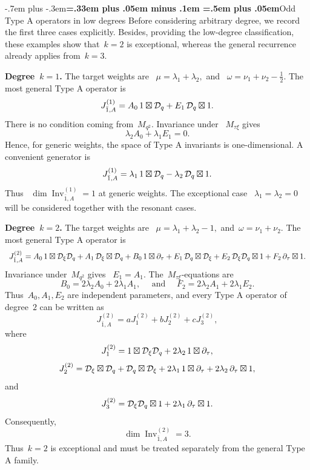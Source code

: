 \documentclass[12pt,a4paper]{amsart}
\makeatletter
\providecommand{\headspaces}{\spaceskip=.33em plus .05em minus .1em \xspaceskip=.5em plus .05em}
\def\subsubsection{\@startsection{subsubsection}{3}{0pt}{-1ex \@plus -.4ex \@minus -.2ex}%
  {-.7em plus -.3em}{\normalfont\normalsize\bfseries\boldmath\headspaces}}
\theoremstyle{thm}
\theoremstyle{definition}
\newcommand {\Dq}{\cD_q}
\newcommand {\Dxi}{\cD_\xi}
\makeatother
\begin{document}
\subsubsection{Odd Type A operators in low degrees}
Before considering arbitrary degree, we record the first three cases
explicitly. Besides, providing the low-degree classification, these
examples show that~\(k=2\) is exceptional, whereas the general
recurrence already applies from~\(k=3\).

{\bf Degree~\(k=1\).} The target weights are~%
$
\mu=\lambda_1+\lambda_2,
$ and~%
$\omega=\nu_1+\nu_2-\frac12.
$ The most general Type A operator is
\[
J_{\bar1,A}^{(1)}
=
A_0\,1\boxtimes \Dq
+
E_1\,\Dq\boxtimes1.
\]
There is no condition coming from~\(M_{q^2}\). Invariance under~%
\(M_{\tau\xi}\) gives
\[
\lambda_2A_0+\lambda_1E_1=0.
\]
Hence, for generic weights, the space of Type A invariants is
one-dimensional. A convenient generator is
\[
J_{\bar1,A}^{(1)}
=
\lambda_1\,1\boxtimes \Dq
-
\lambda_2\,\Dq\boxtimes1.
\]
Thus~%
$
\dim\operatorname{Inv}_{\bar1,A}^{(1)}=1
$ at generic weights. The exceptional case~%
$
\lambda_1=\lambda_2=0
$ will be considered together with the resonant cases.

{\bf Degree~\(k=2\).} The target weights are~%
$
\mu=\lambda_1+\lambda_2-1,
$ and~$
\omega=\nu_1+\nu_2.
$ The most general Type A operator is
\[
\begin{array}{r@{}l}
J_{\bar1,A}^{(2)}
={}&
A_0\,1\boxtimes \Dxi\Dq
+
A_1\,\Dxi\boxtimes \Dq
+
B_0\,1\boxtimes \partial_\tau
+
E_1\,\Dq\boxtimes \Dxi
+
E_2\,\Dxi\Dq\boxtimes1
+
F_2\,\partial_\tau\boxtimes1.
\end{array}
\]
Invariance under~\(M_{q^2}\) gives~%
$E_1=A_1.$ The~\(M_{\tau\xi}\)-equations are
\[
B_0
=
2\lambda_2A_0+2\lambda_1A_1,
\quad \text{ and } \quad F_2
=
2\lambda_2A_1+2\lambda_1E_2.
\]
Thus~\(A_0,A_1,E_2\) are independent parameters, and every Type A
operator of degree~\(2\) can be written as
\[
J_{\bar1,A}^{(2)}
=
aJ_1^{(2)}+bJ_2^{(2)}+cJ_3^{(2)},
\]
where
\[
J_1^{(2)}
=
1\boxtimes \Dxi\Dq
+
2\lambda_2\,1\boxtimes \partial_\tau,
\]
\[
J_2^{(2)}
=
\Dxi\boxtimes \Dq
+
\Dq\boxtimes \Dxi
+
2\lambda_1\,1\boxtimes \partial_\tau
+
2\lambda_2\,\partial_\tau\boxtimes1,
\]
and
\[
J_3^{(2)}
=
\Dxi\Dq\boxtimes1
+
2\lambda_1\,\partial_\tau\boxtimes1.
\]
Consequently,
\[
\dim\operatorname{Inv}_{\bar1,A}^{(2)}=3.
\]
Thus~\(k=2\) is exceptional and must be treated separately from
the general Type A family.
\end{document}
